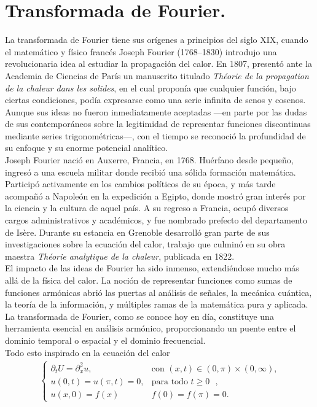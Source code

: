 \section{Transformada de Fourier.}
  La transformada de Fourier tiene sus orígenes a principios del siglo XIX, cuando el matemático y físico francés Joseph Fourier (1768–1830) introdujo una revolucionaria idea al estudiar la propagación del calor. En 1807, presentó ante la Academia de Ciencias de París un manuscrito titulado \emph{Théorie de la propagation de la chaleur dans les solides}, en el cual proponía que cualquier función, bajo ciertas condiciones, podía expresarse como una serie infinita de senos y cosenos. Aunque sus ideas no fueron inmediatamente aceptadas —en parte por las dudas de sus contemporáneos sobre la legitimidad de representar funciones discontinuas mediante series trigonométricas—, con el tiempo se reconoció la profundidad de su enfoque y su enorme potencial analítico.\\
  Joseph Fourier nació en Auxerre, Francia, en 1768. Huérfano desde pequeño, ingresó a una escuela militar donde recibió una sólida formación matemática. Participó activamente en los cambios políticos de su época, y más tarde acompañó a Napoleón en la expedición a Egipto, donde mostró gran interés por la ciencia y la cultura de aquel país. A su regreso a Francia, ocupó diversos cargos administrativos y académicos, y fue nombrado prefecto del departamento de Isère. Durante su estancia en Grenoble desarrolló gran parte de sus investigaciones sobre la ecuación del calor, trabajo que culminó en su obra maestra \emph{Théorie analytique de la chaleur}, publicada en 1822.\\
  El impacto de las ideas de Fourier ha sido inmenso, extendiéndose mucho más allá de la física del calor. La noción de representar funciones como sumas de funciones armónicas abrió las puertas al análisis de señales, la mecánica cuántica, la teoría de la información, y múltiples ramas de la matemática pura y aplicada. La transformada de Fourier, como se conoce hoy en día, constituye una herramienta esencial en análisis armónico, proporcionando un puente entre el dominio temporal o espacial y el dominio frecuencial.\\
  Todo esto inspirado en la ecuación del calor
  \begin{align*}
    \begin{cases}
      \partial_{t}U=\partial^{2}_{x}u,&\text{con $(x,t)\in(0,\pi)\times (0,\infty)$,}\\
      u(0,t)=u(\pi,t)=0, &\text{para todo $t\geq 0$ },\\
      u(x,0)=f(x)&f(0)=f(\pi)=0.
    \end{cases}
  \end{align*}
